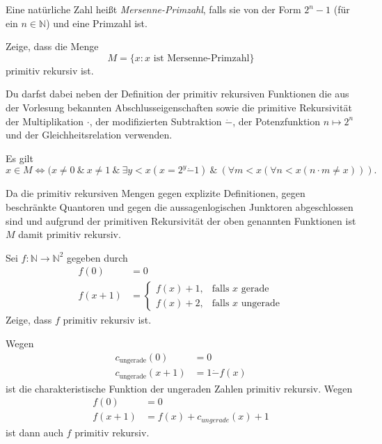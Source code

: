\documentclass[german,headsepline]{scrartcl}
\begin{document}
	\begin{question}[subtitle={Nachklausur 2013}]
		Eine natürliche Zahl heißt \emph{Mersenne-Primzahl}, falls sie von der Form $2^n-1$ (für ein $n\in\mathbb{N}$) und eine Primzahl ist.
		
		Zeige, dass die Menge
		\[M=\{x\colon x\text{ ist Mersenne-Primzahl}\}\]
		primitiv rekursiv ist.
		
		Du darfst dabei neben der Definition der primitiv rekursiven Funktionen
		die aus der Vorlesung bekannten Abschlusseigenschaften
		sowie die primitive Rekursivität der Multiplikation $\cdot$,
		der modifizierten Subtraktion $\dot{-}$,
		der Potenzfunktion $n\mapsto2^n$ und der Gleichheitsrelation verwenden.
	\end{question}
	\begin{solution}
		Es gilt
		\[x\in M\Leftrightarrow(x\neq0~\&~x\neq1~\&~\exists y<x(x=2^y\dot{-}1)~\&~(\forall m<x(\forall n<x(n\cdot m\neq x))).\]
		
		Da die primitiv rekursiven Mengen gegen explizite Definitionen,
		gegen beschränkte Quantoren und gegen die aussagenlogischen Junktoren abgeschlossen sind
		und aufgrund der primitiven Rekursivität der oben genannten Funktionen
		ist $M$ damit primitiv rekursiv.
	\end{solution}
	
	\begin{question}[subtitle={Blatt 13, 2015}]
		Sei $f:\mathbb{N}\to\mathbb{N}^2$ gegeben durch
		\begin{align*}
			f(0) &= 0 \\
			f(x+1) &= \begin{cases}
				f(x)+1, &\text{falls $x$ gerade} \\
				f(x)+2, &\text{falls $x$ ungerade}
			\end{cases}
		\end{align*}
		Zeige, dass $f$ primitiv rekursiv ist.
	\end{question}
	\begin{solution}
		Wegen
		\begin{align*}
			c_{\text{ungerade}}(0) &= 0 \\
			c_{\text{ungerade}}(x+1) &= 1\dot{-}f(x)
		\end{align*}
		ist die charakteristische Funktion der ungeraden Zahlen primitiv rekursiv.
		Wegen
		\begin{align*}
			f(0) &= 0 \\
			f(x+1) &= f(x) + c_{ungerade}(x) + 1
		\end{align*}
		ist dann auch $f$ primitiv rekursiv.
	\end{solution}
	
\end{document}
